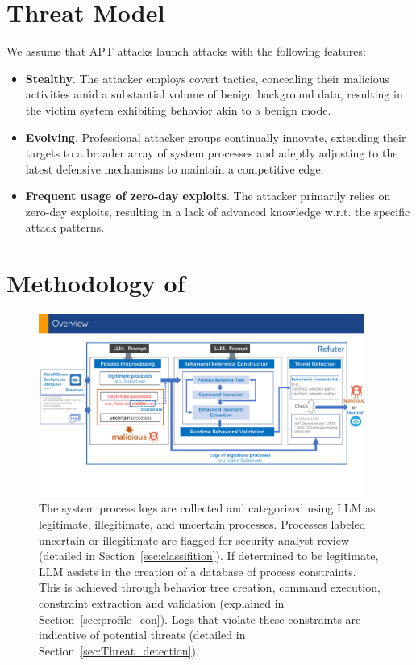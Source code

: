 \section{Threat Model}\label{sec:threatModel}
We assume that APT attacks launch attacks with the following features:

\begin{itemize}[leftmargin=*]
    \item \textbf{Stealthy}. The attacker employs covert tactics, concealing their malicious activities amid a substantial volume of benign background data, resulting in the victim system exhibiting behavior akin to a benign mode.
    \item \textbf{Evolving}. Professional attacker groups continually innovate, extending their targets to a broader array of system processes and adeptly adjusting to the latest defensive mechanisms to maintain a competitive edge.
    \item \textbf{Frequent usage of zero-day exploits}. The attacker primarily relies on zero-day exploits, resulting in a lack of advanced knowledge w.r.t. the specific attack patterns.
\end{itemize}

\section{Methodology of \tool}

\begin{figure}[ht]
    \centering
      \includegraphics[width=0.95\textwidth]{figs/framework.pdf}
    \caption{The system process logs are collected and categorized using LLM as legitimate, illegitimate, and uncertain processes. Processes labeled uncertain or illegitimate are flagged for security analyst review (detailed in Section~\ref{sec:classifition}). If determined to be legitimate, LLM assists in the creation of a database of process constraints. This is achieved through behavior tree creation, command execution, constraint extraction and validation (explained in Section~\ref{sec:profile_con}). Logs that violate these constraints are indicative of potential threats (detailed in Section~\ref{sec:Threat_detection}).}
    \label{fig-framework}
    \end{figure}


